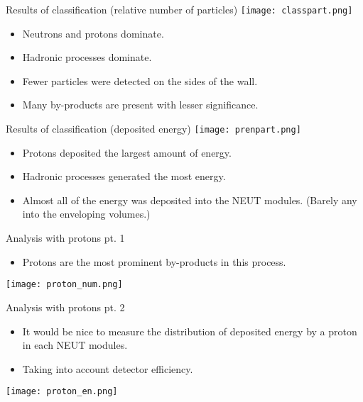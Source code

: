 \documentclass[11pt]{beamer}
\begin{document}
\begin{frame}{Results of classification (relative number of particles)}
    \centering
    \texttt{[image: classpart.png]}
    \begin{itemize}
    \vspace{0.2 cm}
        \item<tri@1-> Neutrons and protons dominate.
        \vspace{0.2 cm}
        \item<tri@1-> Hadronic processes dominate.
        \vspace{0.2 cm}
        \item<tri@1-> Fewer particles were detected on the sides of the wall.
        \vspace{0.2 cm}
        \item<tri@1-> Many by-products are present with lesser significance.
    \end{itemize}
\end{frame}

\begin{frame}{Results of classification (deposited energy)}
    \centering
    \texttt{[image: prenpart.png]}
    \begin{itemize}
    \vspace{0.2 cm}
        \item<tri@1-> Protons deposited the largest amount of energy.
        \vspace{0.2 cm}
        \item<tri@1-> Hadronic processes generated the most energy.
        \vspace{0.2 cm}
        \item<tri@1-> Almost all of the energy was deposited into the NEUT modules. (Barely any into the enveloping volumes.)
    \end{itemize}
\end{frame}

\begin{frame}{Analysis with protons pt. 1}
    \begin{itemize}
        \item<tri@1-> Protons are the most prominent by-products in this process.
        \vspace{0.4 cm}
    \end{itemize}
    \texttt{[image: proton\_num.png]}
\end{frame}

\begin{frame}{Analysis with protons pt. 2}
    \begin{itemize}
        \item<tri@1-> It would be nice to measure the distribution of deposited energy by a proton in each NEUT modules.
        \vspace{0.2 cm}
        \item<tri@1-> Taking into account detector efficiency.
        \vspace{0.4 cm}
    \end{itemize}
    \texttt{[image: proton\_en.png]}
\end{frame}
\end{document}
